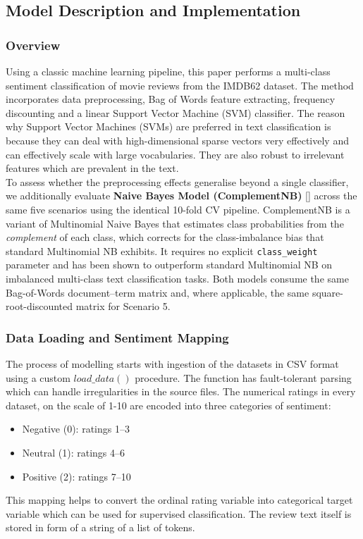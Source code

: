 \documentclass[a4paper,10pt]{article}
\begin{document}
\subsection{Model Description and Implementation}

\subsubsection{Overview}
Using a classic machine learning pipeline, this paper performs a multi-class sentiment classification of movie reviews from the IMDB62 dataset. The method incorporates data preprocessing, Bag of Words feature extracting, frequency discounting and a linear Support Vector Machine (SVM) classifier. The reason why Support Vector Machines (SVMs) are preferred in text classification is because they can deal with high-dimensional sparse vectors very effectively and can effectively scale with large vocabularies. They are also robust to irrelevant features which are prevalent in the text.\\
To assess whether the preprocessing effects generalise beyond a single
classifier, we additionally evaluate \textbf{Naive Bayes
Model (ComplementNB)} [\citet{wang2012baselines}] across the same five scenarios
using the identical 10-fold CV pipeline. ComplementNB is a variant of
Multinomial Naive Bayes that estimates class probabilities from the
\emph{complement} of each class, which corrects for the class-imbalance
bias that standard Multinomial NB exhibits. It requires no explicit
\texttt{class\_weight} parameter and has been shown to outperform standard
Multinomial NB on imbalanced multi-class text classification tasks. Both
models consume the same Bag-of-Words document–term matrix and, where
applicable, the same square-root-discounted matrix for Scenario 5.

\subsubsection{Data Loading and Sentiment Mapping}
The process of modelling starts with ingestion of the datasets in CSV format using a custom $load\_data()$ procedure. The function has fault-tolerant parsing which can handle irregularities in the source files. The numerical ratings in every dataset, on the scale of 1-10 are encoded into three categories of sentiment:
\begin{itemize}\itemsep0.1em
    \item Negative (0): ratings 1–3
    \item Neutral (1): ratings 4–6
    \item Positive (2): ratings 7–10
\end{itemize}
This mapping helps to convert the ordinal rating variable into categorical target variable which can be used for supervised classification. The review text itself is stored in form of a string of a list of tokens.
\end{document}

